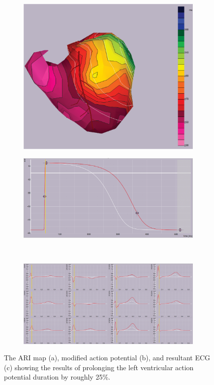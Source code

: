 \documentclass[12pt]{article}
\begin{document}
\begin{figure}[H]
	\begin{subfigure}{.5\textwidth}
		\centering
		\includegraphics[width=.95\linewidth]{Figures/2_2_25ARI.png}
		\caption{}
		
	\end{subfigure}%
	\begin{subfigure}{.5\textwidth}
		\centering
		\includegraphics[width=.95\linewidth]{Figures/2_2_25Actionpotential.png}
		\caption{}
	
	\end{subfigure}%
	\\
	\begin{subfigure}{.95\textwidth}
		\centering
		\includegraphics[width=.95\linewidth]{Figures/2_2_25ecg.png}
		\caption{}
		
	\end{subfigure}
	\caption{The ARI map (a), modified action potential (b), and resultant ECG (c) showing the results of prolonging the left ventricular action potential duration by roughly 25\%.}
	\label{2_2_25}
\end{figure}
\end{document}
